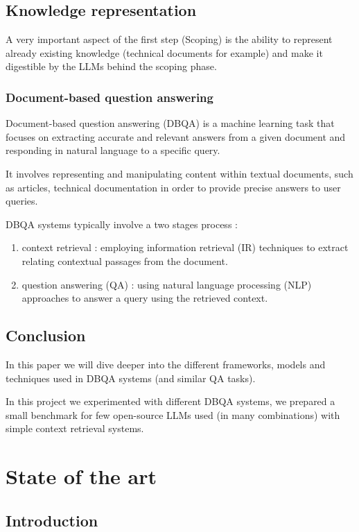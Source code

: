 \documentclass[a4paper,12pt]{article}
\begin{document}
\subsection{Knowledge representation}
A very important aspect of the first step (Scoping) is the ability to represent already existing knowledge (technical documents for example) and make it digestible by the LLMs behind the scoping phase.

\subsubsection{Document-based question answering}
Document-based question answering (DBQA) is a machine learning task that focuses on extracting accurate and relevant answers from a given document and responding in natural language to a specific query. 

It involves representing and manipulating content within textual documents, such as articles, technical documentation in order to provide precise answers to user queries.

DBQA systems typically involve a two stages process : 
\begin{enumerate}
    \item context retrieval : employing information retrieval (IR) techniques to extract relating contextual passages from the document.
    \item question answering (QA) : using natural language processing (NLP) approaches to answer a query using the retrieved context.  
\end{enumerate}  

\subsection{Conclusion}
In this paper we will dive deeper into the different frameworks, models and techniques used in DBQA systems (and similar QA tasks).

In this project we experimented with different DBQA systems, we prepared a small benchmark for few open-source LLMs used (in many combinations) with simple context retrieval systems.

\clearpage
\section{State of the art}

\subsection{Introduction}
\end{document}
